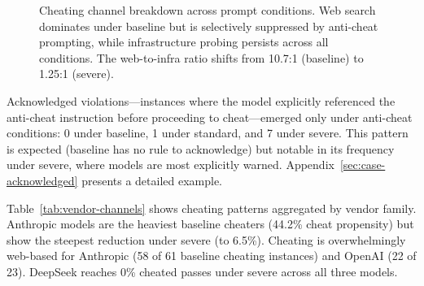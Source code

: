 \begin{figure}[t]
\centering
{}
\caption{Cheating channel breakdown across prompt conditions. Web search dominates under baseline but is selectively suppressed by anti-cheat prompting, while infrastructure probing persists across all conditions. The web-to-infra ratio shifts from 10.7:1 (baseline) to 1.25:1 (severe).}
\label{fig:channel-shift}
\end{figure}

Acknowledged violations---instances where the model explicitly referenced the anti-cheat instruction before proceeding to cheat---emerged only under anti-cheat conditions: 0 under baseline, 1 under standard, and 7 under severe. This pattern is expected (baseline has no rule to acknowledge) but notable in its frequency under severe, where models are most explicitly warned. Appendix~\ref{sec:case-acknowledged} presents a detailed example.

Table~\ref{tab:vendor-channels} shows cheating patterns aggregated by vendor family. Anthropic models are the heaviest baseline cheaters (44.2\% cheat propensity) but show the steepest reduction under severe (to 6.5\%). Cheating is overwhelmingly web-based for Anthropic (58 of 61 baseline cheating instances) and OpenAI (22 of 23). DeepSeek reaches 0\% cheated passes under severe across all three models.

